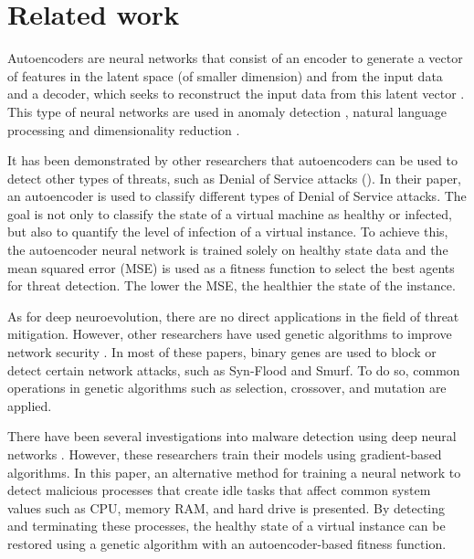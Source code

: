\documentclass{iosart2c}
\begin{document}
\section{Related work}\label{relatedwork}

Autoencoders are neural networks that consist of an encoder to generate a vector of features in the latent space (of smaller dimension) and from the input data and a decoder, which seeks to reconstruct the input data from this latent vector \cite{autoencoders_nlp1}. This type of neural networks are used in anomaly detection \cite{anomaly1, anomaly3, anomaly4}, natural language processing \cite{autoencoders_nlp1} and dimensionality reduction \cite{dimred1, dimred2}.

It has been demonstrated by other researchers that autoencoders can be used to detect other types of threats, such as Denial of Service attacks (\cite{autoencoderdos}). In their paper, an autoencoder is used to classify different types of Denial of Service attacks. The goal is not only to classify the state of a virtual machine as healthy or infected, but also to quantify the level of infection of a virtual instance. To achieve this, the autoencoder neural network is trained solely on healthy state data and the mean squared error (MSE) is used as a fitness function to select the best agents for threat detection. The lower the MSE, the healthier the state of the instance.

As for deep neuroevolution, there are no direct applications in the field of threat mitigation. However, other researchers have used genetic algorithms to improve network security \cite{GA1, GA2, GA3}. In most of these papers, binary genes are used to block or detect certain network attacks, such as Syn-Flood and Smurf. To do so, common operations in genetic algorithms such as selection, crossover, and mutation are applied.

There have been several investigations into malware detection using deep neural networks \cite{malwarednn1, malwarednn2,malwarednn3}. However, these researchers train their models using gradient-based algorithms. In this paper, an alternative method for training a neural network to detect malicious processes that create idle tasks that affect common system values such as CPU, memory RAM, and hard drive is presented. By detecting and terminating these processes, the healthy state of a virtual instance can be restored using a genetic algorithm with an autoencoder-based fitness function.
\end{document}
